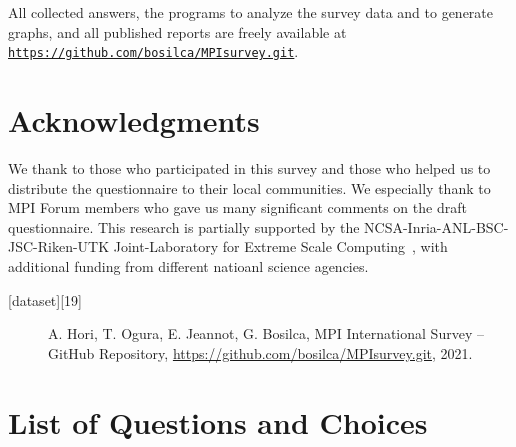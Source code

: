 \documentclass[preprint,5p,times]{elsarticle}
\begin{document}
{All collected answers, the programs to analyze the survey data and to
generate graphs, and all published reports are freely available at
{\tt \url{https://github.com/bosilca/MPIsurvey.git}}.

\section*{Acknowledgments}

We thank to those who participated in this survey and those who helped us to
distribute the questionnaire to their local communities. We especially thank to
MPI Forum members who gave us many significant comments on the draft
questionnaire. This research is partially supported by the
NCSA-Inria-ANL-BSC-JSC-Riken-UTK Joint-Laboratory for Extreme Scale
Computing~\cite{JLESC}, with additional funding from different natioanl science
agencies.



{\footnotesize
  \begin{description}
  \item[{[dataset][19]}] A. Hori, T. Ogura, E. Jeannot,
G. Bosilca, MPI International Survey – GitHub Repository,
\url{https://github.com/bosilca/MPIsurvey.git}, 2021.
  \end{description}
}

\appendix
\section{List of Questions and Choices}
\label{app:questions}

}
\end{document}
